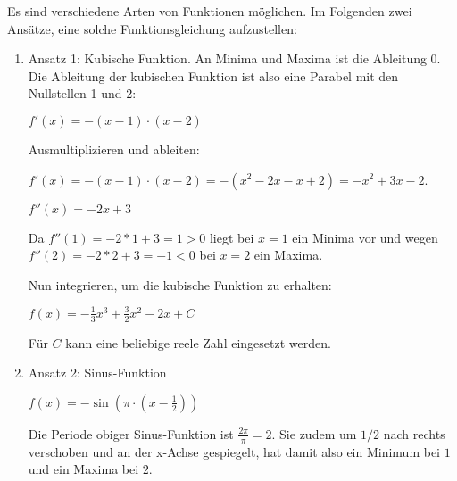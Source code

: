 \item Es sind verschiedene Arten von Funktionen möglichen. Im Folgenden zwei Ansätze, eine solche Funktionsgleichung aufzustellen:

\begin{enumerate}

\item Ansatz 1: Kubische Funktion. An Minima und Maxima ist die Ableitung 0. Die Ableitung der kubischen Funktion ist also eine Parabel mit den Nullstellen 1 und 2:

$f'(x)=-(x-1)\cdot(x-2)$

Ausmultiplizieren und ableiten:

$f'(x)=-(x-1)\cdot(x-2)= -(x^2-2x-x+2)=-x^2+3x-2$.

$f''(x) = -2x+3$

Da $f''(1) = -2*1+3 = 1 > 0$ liegt bei $x=1$ ein Minima vor und wegen $f''(2) = -2*2+3 = -1 < 0$ bei $x=2$ ein Maxima.

Nun integrieren, um die kubische Funktion zu erhalten:

$f(x) = -\frac{1}{3}x^3+\frac{3}{2}x^2-2x+C$

Für $C$ kann eine beliebige reele Zahl eingesetzt werden.

\item Ansatz 2: Sinus-Funktion

$f(x)=-\sin(\pi \cdot (x-\frac{1}{2}))$

Die Periode obiger Sinus-Funktion ist $\frac{2\pi}{\pi} = 2$. Sie zudem um $1/2$ nach rechts verschoben und an der x-Achse gespiegelt, hat damit also ein Minimum bei $1$ und ein Maxima bei $2$.

\end{enumerate}

